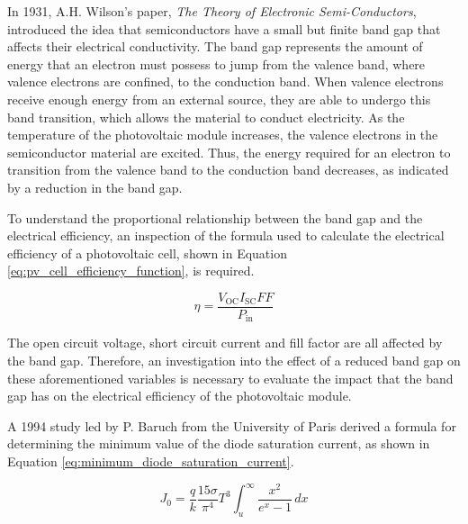 \noindent In 1931, A.H. Wilson's paper, \textit{The Theory of Electronic Semi-Conductors}, introduced the idea that semiconductors have a small but finite band gap that affects their electrical conductivity. \cite{Il1931TheSemi-Conductors} The band gap represents the amount of energy that an electron must possess to jump from the valence band, where valence electrons are confined, to the conduction band. When valence electrons receive enough energy from an external source, they are able to undergo this band transition, which allows the material to conduct electricity. \cite{CircuitBread2018BandElectronics} As the temperature of the photovoltaic module increases, the valence electrons in the semiconductor material are excited. Thus, the energy required for an electron to transition from the valence band to the conduction band decreases, as indicated by a reduction in the band gap. \cite{Renewable_Tek2025HOTExplained} \par\vspace{0.5em}

\noindent To understand the proportional relationship between the band gap and the electrical efficiency, an inspection of the formula used to calculate the electrical efficiency of a photovoltaic cell, shown in Equation \ref{eq:pv_cell_efficiency_function}, is required. \cite{HonsbergSolarEfficiency}

\begin{equation}
    \eta = \frac{V_\text{OC}I_\text{SC}FF}{P_\text{in}}
    \label{eq:pv_cell_efficiency_function}
\end{equation}

\noindent The open circuit voltage, short circuit current and fill factor are all affected by the band gap. Therefore, an investigation into the effect of a reduced band gap on these aforementioned variables is necessary to evaluate the impact that the band gap has on the electrical efficiency of the photovoltaic module.\par\vspace{0.5em}

\noindent A 1994 study led by P. Baruch from the University of Paris derived a formula for determining the minimum value of the diode saturation current, as shown in Equation \ref{eq:minimum_diode_saturation_current}.

\begin{equation}
    J_0 = \frac{q}{k} \frac{15\sigma}{\pi^4} T^3 \int_{u}^{\infty} \frac{x^2}{e^x - 1}\,dx
    \label{eq:minimum_diode_saturation_current}
\end{equation}

